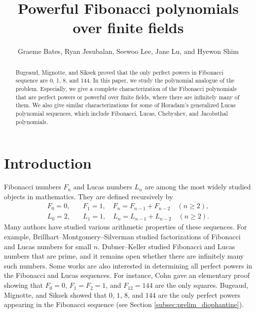 \documentclass[letterpaper, 10pt]{article}
\newcommand{\1}{\mathds{1}}	%
\theoremstyle{definition}
\theoremstyle{remark}
\begin{document}

\title{Powerful Fibonacci polynomials over finite fields}


\author{Graeme Bates, Ryan Jesubalan, Seewoo Lee, Jane Lu, and Hyewon Shim}
\date{}


\maketitle



\begin{abstract}
    Bugeaud, Mignotte, and Siksek proved that the only perfect powers in Fibonacci sequence are 0, 1, 8, and 144.
    In this paper, we study the polynomial analogue of the problem. Especially, we give a complete characterization of the Fibonacci polynomials that are perfect powers or powerful over finite fields, where there are infinitely many of them.
    We also give similar characterizations for some of Horadam's generalized Lucas polynomial sequences, which include Fibonacci, Lucas, Chebyshev, and Jacobsthal polynomials.
\end{abstract}

\section{Introduction}
\label{sec:intro}


Fibonacci numbers $F_n$ and Lucas numbers $L_n$ are among the most widely studied objects in mathematics. They are defined recursively by
\begin{align*}
F_0 = 0, &\quad F_1 = 1,\quad F_{n} = F_{n-1} + F_{n-2} \quad(n \ge 2), \\
L_0 = 2, &\quad L_1 = 1,\quad L_{n} = L_{n-1} + L_{n-2} \quad(n \ge 2).
\end{align*}
Many authors have studied various arithmetic properties of these sequences.
For example, Brillhart--Montgomery--Silverman \cite{brillhart1988tables} studied factorizations of Fibonacci and Lucas numbers for small $n$. Dubner--Keller \cite{dubner1999new} studied Fibonacci and Lucas numbers that are prime, and it remains open whether there are infinitely many such numbers.
Some works are also interested in determining all perfect powers in the Fibonacci and Lucas sequences.
For instance, Cohn \cite{cohn1964square} gave an elementary proof showing that $F_0 = 0$, $F_1 = F_2 = 1$, and $F_{12} = 144$ are the only squares.
Bugeaud, Mignotte, and Siksek \cite{bugeaud2006classical} showed that $0$, $1$, $8$, and $144$ are the only perfect powers appearing in the Fibonacci sequence (see Section \ref{subsec:prelim_diophantine}).
\end{document}
